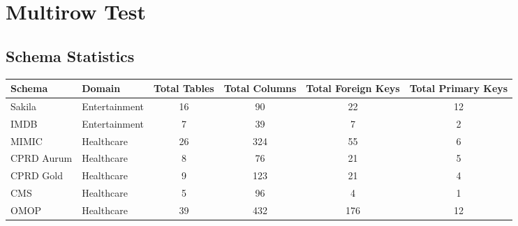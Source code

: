 \documentclass{article}%
\begin{document}
%
\normalsize%
\section{Multirow Test}%
\label{sec:MultirowTest}%
\subsection{Schema Statistics}%
\label{subsec:SchemaStatistics}%
\begin{tabu}{|llcccc|}%
\hline%
Schema&Domain&Total Tables&Total Columns&Total Foreign Keys&Total Primary Keys\\%
\hline%
Sakila&Entertainment&16&90&22&12\\%
\hline%
IMDB&Entertainment&7&39&7&2\\%
\hline%
MIMIC&Healthcare&26&324&55&6\\%
\hline%
CPRD Aurum&Healthcare&8&76&21&5\\%
\hline%
CPRD Gold&Healthcare&9&123&21&4\\%
\hline%
CMS&Healthcare&5&96&4&1\\%
\hline%
OMOP&Healthcare&39&432&176&12\\%
\hline%
\end{tabu}

%
\end{document}
